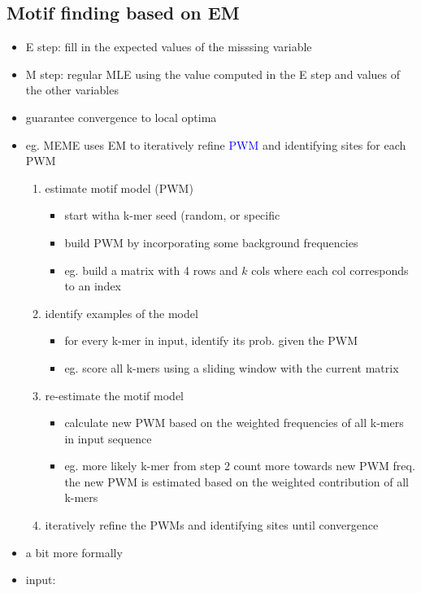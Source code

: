 \documentclass[font=12pt]{article}
\begin{document}
\subsection{Motif finding based on EM}
\begin{itemize}
	\item E step: fill in the expected values of the misssing variable
	\item M step: regular MLE using the value computed in the E step and values of the other variables
	\item guarantee convergence to local optima
	\item eg. MEME uses EM to iteratively refine \textcolor{blue}{PWM} and identifying sites for each PWM\
	\begin{enumerate}
		\item estimate motif model (PWM)
			\begin{itemize}
				\item start witha k-mer seed (random, or specific
				\item build PWM by incorporating some background frequencies
				\item eg. build a matrix with 4 rows and $k$ cols where each col corresponds to an index 
			\end{itemize}
		\item identify examples of the model
			\begin{itemize}
				\item for every k-mer in input, identify its prob. given the PWM
				\item eg. score all k-mers using a sliding window with the current matrix
			\end{itemize}
		\item  re-estimate the motif model
			\begin{itemize}
				\item calculate new PWM based on the weighted frequencies of all k-mers in input sequence
				\item eg. more likely k-mer from step 2 count more towards new PWM freq. the new PWM is estimated based on the weighted contribution of all k-mers
			\end{itemize}
		\item  iteratively refine the PWMs and identifying sites until convergence
	\end{enumerate}
	\item a bit more formally
	\item input:
		\begin{itemize}

\end{itemize}
\end{itemize}
\end{document}
